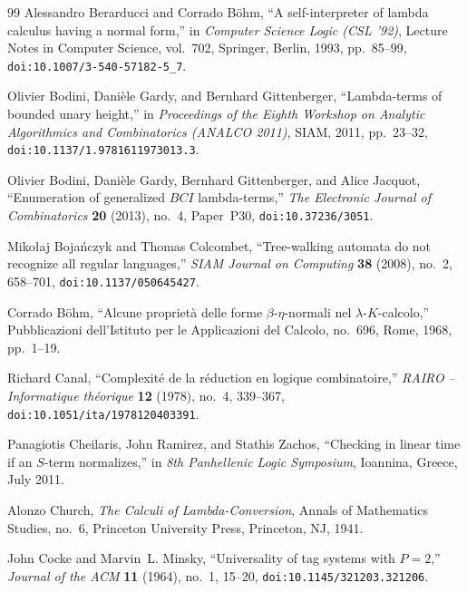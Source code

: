 \documentclass[11pt,reqno]{amsart}
\numberwithin{equation}{section}
\theoremstyle{plain}
\theoremstyle{definition}
\theoremstyle{remark}
\begin{document}
\begin{thebibliography}{99}
Alessandro Berarducci and Corrado B{\"o}hm,
``A self-interpreter of lambda calculus having a normal form,''
in \emph{Computer Science Logic (CSL '92)},
Lecture Notes in Computer Science, vol.~702, Springer, Berlin, 1993, pp.~85--99,
\texttt{doi:10.1007/3-540-57182-5\_7}.

Olivier Bodini, Dani{\`e}le Gardy, and Bernhard Gittenberger,
``Lambda-terms of bounded unary height,''
in \emph{Proceedings of the Eighth Workshop on Analytic Algorithmics and Combinatorics (ANALCO 2011)},
SIAM, 2011, pp.~23--32, \texttt{doi:10.1137/1.9781611973013.3}.

Olivier Bodini, Dani{\`e}le Gardy, Bernhard Gittenberger, and Alice Jacquot,
``Enumeration of generalized $BCI$ lambda-terms,''
\emph{The Electronic Journal of Combinatorics} \textbf{20} (2013), no.~4, Paper~P30,
\texttt{doi:10.37236/3051}.

Miko{\l}aj Boja{\'n}czyk and Thomas Colcombet,
``Tree-walking automata do not recognize all regular languages,''
\emph{SIAM Journal on Computing} \textbf{38} (2008), no.~2, 658--701,
\texttt{doi:10.1137/050645427}.

Corrado B{\"o}hm,
``Alcune propriet{\`a} delle forme $\beta$-$\eta$-normali nel $\lambda$-$K$-calcolo,''
Pubblicazioni dell'Istituto per le Applicazioni del Calcolo, no.~696, Rome, 1968, pp.~1--19.

Richard Canal,
``Complexit{\'e} de la r{\'e}duction en logique combinatoire,''
\emph{RAIRO -- Informatique th{\'e}orique} \textbf{12} (1978), no.~4, 339--367,
\texttt{doi:10.1051/ita/1978120403391}.

Panagiotis Cheilaris, John Ramirez, and Stathis Zachos,
``Checking in linear time if an $S$-term normalizes,''
in \emph{8th Panhellenic Logic Symposium}, Ioannina, Greece, July 2011.

Alonzo Church, \emph{The Calculi of Lambda-Conversion}, Annals of Mathematics Studies,
no.~6, Princeton University Press, Princeton, NJ, 1941.

John Cocke and Marvin~L. Minsky,
``Universality of tag systems with $P = 2$,''
\emph{Journal of the ACM} \textbf{11} (1964), no.~1, 15--20,
\texttt{doi:10.1145/321203.321206}.


\end{thebibliography}
\end{document}
